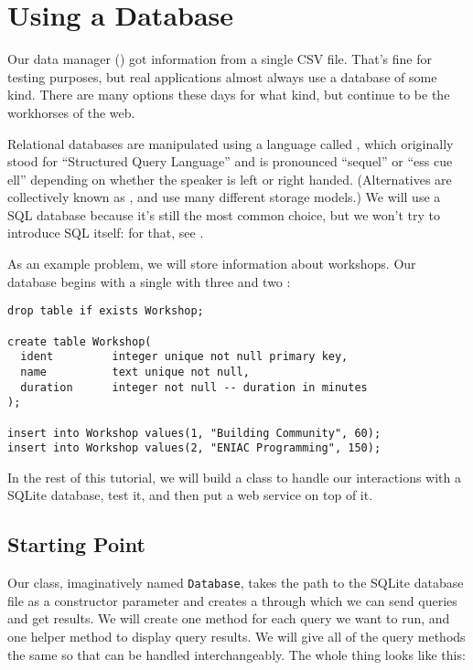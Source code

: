 \chapter{Using a Database}\label{s:db}

Our data manager () got information from a single CSV file.
That's fine for testing purposes,
but real applications almost always use a database of some kind.
There are many options these days for what kind,
but  continue to be
the workhorses of the web.

Relational databases are manipulated using a language called ,
which originally stood for ``Structured Query Language''
and is pronounced ``sequel'' or ``ess cue ell'' depending on whether the speaker is
left or right handed.
(Alternatives are collectively known as ,
and use many different storage models.)
We will use a SQL database because it's still the most common choice,
but we won't try to introduce SQL itself:
for that,
see .

As an example problem,
we will store information about workshops.
Our database begins with a single 
with three 
and two :

\begin{verbatim}
drop table if exists Workshop;

create table Workshop(
  ident         integer unique not null primary key,
  name          text unique not null,
  duration      integer not null -- duration in minutes
);

insert into Workshop values(1, "Building Community", 60);
insert into Workshop values(2, "ENIAC Programming", 150);
\end{verbatim}

In the rest of this tutorial,
we will build a class to handle our interactions with a SQLite database,
test it,
and then put a web service on top of it.

\section{Starting Point}\label{s:db-start}

Our class, imaginatively named \texttt{Database},
takes the path to the SQLite database file as a constructor parameter
and creates a 
through which we can send queries and get results.
We will create one method for each query we want to run,
and one helper method to display query results.
We will give all of the query methods the same 
so that can be handled interchangeably.
The whole thing looks like this:


